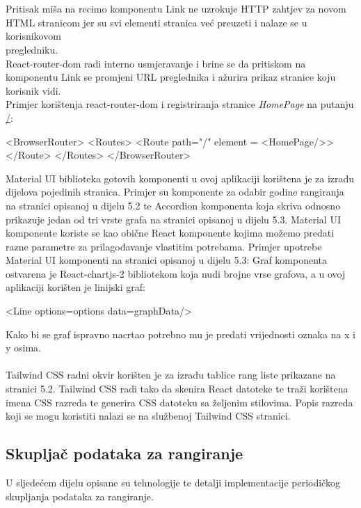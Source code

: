 \documentclass[times, utf8, zavrsni]{fer}
\begin{document}
\\\\Pritisak miša na recimo komponentu Link ne uzrokuje HTTP zahtjev za novom HTML stranicom jer su svi elementi stranica već preuzeti i nalaze se u korisnikovom \\pregledniku.
\\React-router-dom radi interno usmjeravanje i brine se da pritiskom na komponentu Link se promjeni URL preglednika i ažurira prikaz stranice koju korisnik vidi.
\\Primjer korištenja react-router-dom i registriranja stranice \emph{HomePage} na putanju \url{/}:
\begin{verbnobox}[\fontsize{10pt}{10pt}\selectfont]
<BrowserRouter>
    <Routes>
        <Route path="/" element = {<HomePage/>}></Route>
    </Routes>
</BrowserRouter>
\end{verbnobox}
Material UI biblioteka gotovih komponenti u ovoj aplikaciji korištena je za izradu dijelova pojedinih stranica. Primjer su komponente za odabir godine rangiranja
na stranici opisanoj u dijelu 5.2 te Accordion komponenta koja skriva odnosno prikazuje jedan od tri vrste grafa na stranici opisanoj u dijelu 5.3.
Material UI komponente koriste se kao obične React komponente kojima možemo predati razne parametre za prilagođavanje vlastitim potrebama.
Primjer upotrebe Material UI komponenti na stranici opisanoj u dijelu 5.3:
Graf komponenta ostvarena je React-chartjs-2 bibliotekom koja nudi brojne vrse grafova, a u ovoj aplikaciji korišten je linijski graf:
\begin{verbnobox}[\fontsize{10pt}{10pt}\selectfont]
<Line options={options} data={graphData}/>
\end{verbnobox}
Kako bi se graf ispravno nacrtao potrebno mu je predati vrijednosti oznaka na x i y osima.
\\\\Tailwind CSS radni okvir korišten je za izradu tablice rang liste prikazane na stranici 5.2. Tailwind CSS radi tako da skenira React datoteke 
te traži korištena imena CSS razreda te generira CSS datoteku sa željenim stilovima. Popis razreda koji se mogu koristiti nalazi se na službenoj
Tailwind CSS stranici.
\\ \subsection{Skupljač podataka za rangiranje}
U sljedećem dijelu opisane su tehnologije te detalji implementacije periodičkog \\skupljanja podataka za rangiranje.
\end{document}
